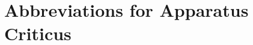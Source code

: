 \documentclass[series=CorpusAvesticum,gitver=true,PhD=false,showgrid=true,colorlinks=true]{brill}
\begin{document}
\chapter*{Abbreviations for Apparatus Criticus}
\printabbreviationsac*





%
%
%
\backmatter
\printabbreviations
\end{document}
